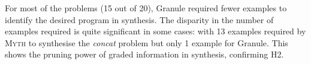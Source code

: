 \begin{table}[h]
\begin{center}
\setlength{\tabcolsep}{0.3em}
\end{center}
\vspace{0.5em}
\caption{Number of examples needed for synthesis, comparing Granule vs. \textsc{Myth}}
\label{tab:example-comp}
\end{table}


For most of the problems (15 out of 20), Granule required fewer examples to identify the desired
program in synthesis. The disparity in the number of examples required is quite significant in some cases: with
13 examples required by \textsc{Myth} to synthesise the \emph{concat} problem but only 1 example for
Granule. This shows the pruning power of graded information in synthesis, confirming H2.


